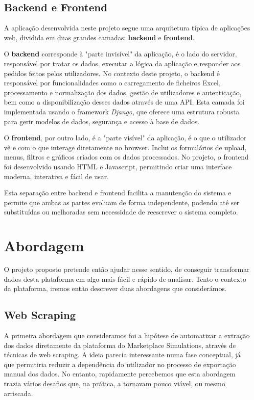 \subsection{Backend e Frontend}

A aplicação desenvolvida neste projeto segue uma arquitetura típica de aplicações web, dividida em duas grandes camadas: \textbf{backend} e \textbf{frontend}.

O \textbf{backend} corresponde à "parte invisível" da aplicação,  é o lado do servidor, responsável por tratar os dados, executar a lógica da aplicação e responder aos pedidos feitos pelos utilizadores. No contexto deste projeto, o backend é responsável por funcionalidades como o carregamento de ficheiros Excel, processamento e normalização dos dados, gestão de utilizadores e autenticação, bem como a disponibilização desses dados através de uma API. Esta camada foi implementada usando o framework \textit{Django}, que oferece uma estrutura robusta para gerir modelos de dados, segurança e acesso à base de dados.

O \textbf{frontend}, por outro lado, é a "parte visível" da aplicação, é o que o utilizador vê e com o que interage diretamente no browser. Inclui os formulários de upload, menus, filtros e gráficos criados com os dados processados. No projeto, o frontend foi desenvolvido usando HTML e Javascript, permitindo criar uma interface moderna, interativa e fácil de usar.

Esta separação entre backend e frontend facilita a manutenção do sistema e permite que ambas as partes evoluam de forma independente, podendo até ser substituídas ou melhoradas sem necessidade de reescrever o sistema completo.

\section{Abordagem}
\label{sec:abordagem}

O projeto proposto pretende então ajudar nesse sentido, de conseguir transformar dados desta plataforma em algo mais fácil e rápido de analisar. Tento o contexto da plataforma, iremos então descrever duas abordagens que considerámos.

\subsection{Web Scraping}
A primeira abordagem que consideramos foi a hipótese de automatizar a extração dos dados diretamente da plataforma do Marketplace Simulations, através de técnicas de web scraping. A ideia parecia interessante numa fase conceptual, já que permitiria reduzir a dependência do utilizador no processo de exportação manual dos dados. No entanto, rapidamente percebemos que esta abordagem trazia vários desafios que, na prática, a tornavam pouco viável, ou mesmo arriscada.

